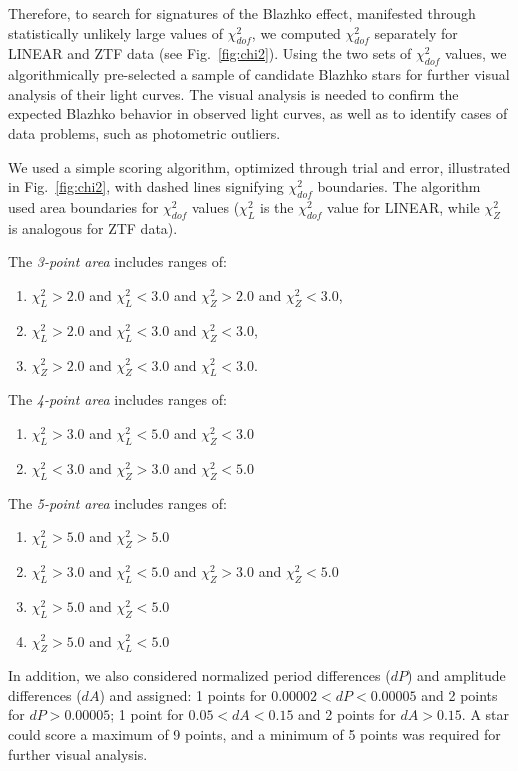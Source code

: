 Therefore, to search for signatures of the Blazhko effect, manifested through statistically unlikely large values
of $\chi^2_{dof}$, we computed $\chi^2_{dof}$ separately for LINEAR and ZTF data (see Fig.~\ref{fig:chi2}). 
Using the two sets of $\chi^2_{dof}$ values, we algorithmically pre-selected a sample of candidate Blazhko stars
for further visual analysis of their light curves. The visual analysis is needed to confirm the expected Blazhko behavior
in observed light curves, as well as to identify cases of data problems, such as photometric outliers. 

We used a simple scoring algorithm, optimized through trial and error, illustrated in Fig.~\ref{fig:chi2}, with dashed lines signifying $\chi^2_{dof}$ boundaries.
The algorithm used area boundaries for $\chi^2_{dof}$ values ($\chi^2_L$ is the $\chi^2_{dof}$ value for LINEAR, while $\chi^2_Z$ is analogous for ZTF data).

The \textit{3-point area} includes ranges of:
\begin{enumerate}
    \item $\chi^2_L > 2.0$ and $\chi^2_L < 3.0$ and $\chi^2_Z > 2.0$ and $\chi^2_Z < 3.0$,
    \item $\chi^2_L > 2.0$ and $\chi^2_L < 3.0$ and $\chi^2_Z < 3.0$,
    \item $\chi^2_Z > 2.0$ and $\chi^2_Z < 3.0$ and $\chi^2_L <3.0$.
\end{enumerate}

The \textit{4-point area} includes ranges of:

\begin{enumerate}
\item $\chi^2_L > 3.0$ and $\chi^2_L < 5.0$ and $\chi^2_Z < 3.0$
\item $\chi^2_L < 3.0$ and $\chi^2_Z > 3.0$ and $\chi^2_Z < 5.0$
\end{enumerate}
    
The \textit{5-point area} includes ranges of:

\begin{enumerate}
\item $\chi^2_L > 5.0$ and $\chi^2_Z > 5.0$
\item $\chi^2_L > 3.0$ and $\chi^2_L < 5.0$ and $\chi^2_Z > 3.0$ and $\chi^2_Z < 5.0$
\item $\chi^2_L > 5.0$ and $\chi^2_Z < 5.0$
\item $\chi^2_Z > 5.0$ and $\chi^2_L < 5.0$
\end{enumerate}

In addition, we also considered normalized period differences ($dP$) and amplitude differences ($dA$) and assigned: 1 points for $0.00002 < dP < 0.00005$
and 2 points for $dP > 0.00005$; 1 point for $0.05 < dA < 0.15$ and 2 points for $dA > 0.15$. 
A star could score a maximum of 9 points, and a minimum of 5 points was required for further visual analysis. 

